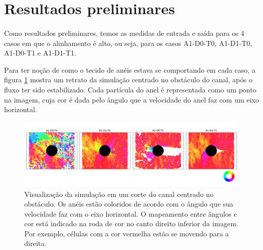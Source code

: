 \documentclass{article}
\theoremstyle{definition}
\def \case#1#2#3{A{#1}-D{#2}-T{#3}}
\begin{document}

\section{Resultados preliminares}
\paragraph{}
Como resultados preliminares, temos as medidas de entrada e saída para os 4 casos em que o alinhamento é alto, ou seja, para os casos \case{1}{0}{0}, \case{1}{1}{0}, \case{1}{0}{1} e \case{1}{1}{1}.

Para ter noção de como o tecido de anéis estava se comportando em cada caso, a figura 
\ref{fig:vel_color_high_align} mostra um retrato da simulação centrado no obstáculo do canal, após o fluxo ter sido estabilizado. Cada partícula do anel é representada como um ponto na imagem, cuja cor é dada pelo ângulo que a velocidade do anel faz com um eixo horizontal.

\begin{figure}[h]
    \centering
    \includegraphics[width=\linewidth]{figuras/vel_color/vel_color_high_align.png}
    \caption{Visualização da simulação em um corte do canal centrado no obstáculo. Os anéis estão coloridos de acordo com o ângulo que sua velocidade faz com o eixo horizontal. O mapeamento entre ângulos e cor está indicado na roda de cor no canto direito inferior da imagem. Por exemplo, células com a cor vermelha estão se movendo para a direita.}
    \label{fig:vel_color_high_align}
\end{figure}
\end{document}
